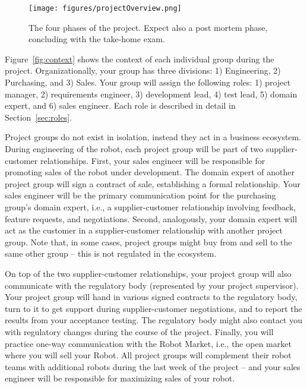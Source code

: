 \documentclass{scrreprt}
\begin{document}
\begin{figure}
\centering
\texttt{[image: figures/projectOverview.png]}
\caption{The four phases of the project. Expect also a post mortem phase, concluding with the take-home exam.}
\label{fig:overview}
\end{figure}

Figure~\ref{fig:context} shows the context of each individual group during the project. Organizationally, your group has three divisions: 1) Engineering, 2) Purchasing, and 3) Sales. Your group will assign the following roles: 1) project manager, 2) requirements engineer, 3) development lead, 4) test lead, 5) domain expert, and 6) sales engineer. Each role is described in detail in Section~\ref{sec:roles}.

Project groups do not exist in isolation, instead they act in a business ecosystem. During engineering of the robot, each project group will be part of two supplier-customer relationships. First, your sales engineer will be responsible for promoting sales of the robot under development. The domain expert of another project group will sign a contract of sale, establishing a formal relationship. Your sales engineer will be the primary communication point for the purchasing group's domain expert, i.e., a supplier-customer relationship involving feedback, feature requests, and negotiations. Second, analogously, your domain expert will act as the customer in a supplier-customer relationship with another project group. Note that, in some cases, project groups might buy from and sell to the same other group -- this is not regulated in the ecosystem.

On top of the two supplier-customer relationships, your project group will also communicate with the regulatory body (represented by your project supervisor). Your project group will hand in various signed contracts to the regulatory body, turn to it to get support during supplier-customer negotiations, and to report the results from your acceptance testing. The regulatory body might also contact you with regulatory changes during the course of the project. Finally, you will practice one-way communication with the Robot Market, i.e., the open market where you will sell your Robot. All project groups will complement their robot teams with additional robots during the last week of the project -- and your sales engineer will be responsible for maximizing sales of your robot. 
\end{document}
